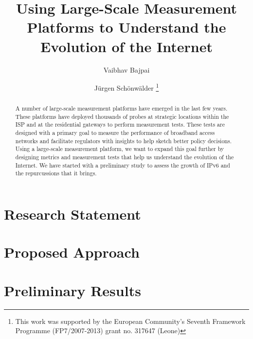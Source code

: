 \documentclass[a4paper]{llncs}
\begin{document}
\mainmatter  %

\title{Using Large-Scale Measurement Platforms to Understand the Evolution of
the Internet}

\author{Vaibhav Bajpai \and Jürgen Schönwälder%
\thanks{This work was supported by the European Community’s Seventh Framework
Programme (FP7/2007-2013) grant no. 317647 (Leone)}}
\maketitle

\begin{abstract}

A number of large-scale measurement platforms have emerged in the last few
years. These platforms have deployed thousands of probes at strategic
locations within the ISP and at the residential gateways to perform
measurement tests. These tests are designed with a primary goal to measure the
performance of broadband access networks and facilitate regulators with
insights to help sketch better policy decisions. Using a large-scale
measurement platform, we want to expand this goal further by designing metrics
and measurement tests that help us understand the evolution of the Internet.
We have started with a preliminary study to assess the growth of IPv6 and
the repurcussions that it brings.

\end{abstract}


\section{Research Statement}
\label{sec:rstatement}
\section{Proposed Approach}
\label{sec:approach}
\section{Preliminary Results}
\label{sec:preliminaryresults}





\end{document}
